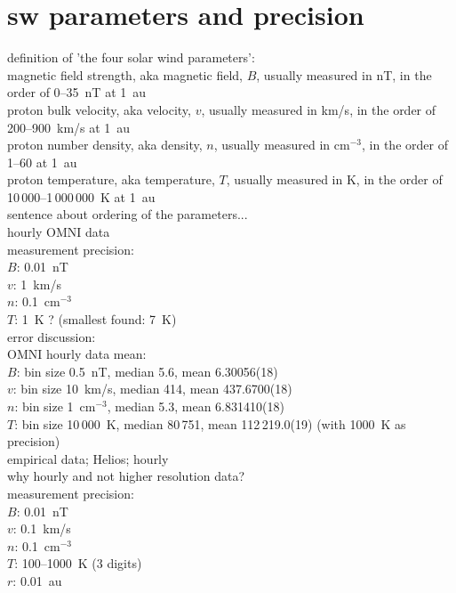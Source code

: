 \section{sw parameters and precision}
definition of 'the four solar wind parameters':\\	%
	magnetic field strength, aka magnetic field, $B$, usually measured in nT, in the order of 0--35~nT at 1~au\\
	proton bulk velocity, aka velocity, $v$, usually measured in km/s, in the order of 200--900~km/s at 1~au\\
	proton number density, aka density, $n$, usually measured in cm$^{-3}$, in the order of 1--60 at 1~au\\
	proton temperature, aka temperature, $T$, usually measured in K, in the order of 10\,000--1\,000\,000~K at 1~au\\
sentence about ordering of the parameters...\\

hourly OMNI data\\
measurement precision:\\
$B$: 0.01~nT\\
$v$: 1~km/s\\
$n$: 0.1~cm$^{-3}$\\
$T$: 1~K ? (smallest found: 7~K)\\

error discussion:\\
OMNI hourly data mean:\\
$B$: bin size 0.5~nT, median 5.6, mean 6.30056(18)\\
$v$: bin size 10~km/s, median 414, mean 437.6700(18)\\
$n$: bin size 1~cm$^{-3}$, median 5.3, mean 6.831410(18)\\
$T$: bin size 10\,000~K, median 80\,751, mean 112\,219.0(19) (with 1000~K as precision)\\

empirical data; Helios; hourly\\
why hourly and not higher resolution data?\\
measurement precision:\\
$B$: 0.01~nT\\
$v$: 0.1~km/s\\
$n$: 0.1~cm$^{-3}$\\
$T$: 100--1000~K (3 digits)\\
$r$: 0.01~au\\

